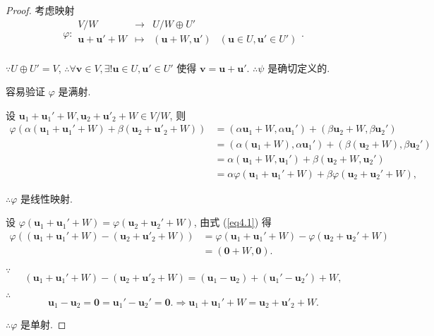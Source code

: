 \documentclass[color=black,device=normal,lang=cn,mode=geye]{elegantnote}
\begin{document}
\begin{proof}
    考虑映射
    \[\varphi:\begin{array}{rcll}
        V/W & \to & U/W\oplus U' \\
        \boldsymbol{u}+\boldsymbol{u}'+W & \mapsto & (\boldsymbol{u}+W,\boldsymbol{u}') & (\boldsymbol{u}\in U,\boldsymbol{u}'\in U') \\
    \end{array}.\]

    $\because U\oplus U'=V$, $\therefore\forall\boldsymbol{v}\in V,\exists!\boldsymbol{u}\in U,\boldsymbol{u}'\in U'$ 使得 $\boldsymbol{v}=\boldsymbol{u}+\boldsymbol{u}'$. $\therefore\psi$ 是确切定义的.

    容易验证 $\varphi$ 是满射.

    设 $\boldsymbol{u}_1+\boldsymbol{u}_1'+W,\boldsymbol{u}_2+\boldsymbol{u}'_2+W\in V/W$, 则
    \begin{equation}\label{eq4.1}
        \begin{aligned}
            \varphi(\alpha(\boldsymbol{u}_1+\boldsymbol{u}_1'+W)+\beta(\boldsymbol{u}_2+\boldsymbol{u}'_2+W)) & =(\alpha\boldsymbol{u}_1+W,\alpha\boldsymbol{u}_1')+(\beta\boldsymbol{u}_2+W,\beta\boldsymbol{u}_2') \\
            & =(\alpha(\boldsymbol{u}_1+W),\alpha\boldsymbol{u}_1')+(\beta(\boldsymbol{u}_2+W),\beta\boldsymbol{u}_2') \\
            & =\alpha(\boldsymbol{u}_1+W,\boldsymbol{u}_1')+\beta(\boldsymbol{u}_2+W,\boldsymbol{u}_2') \\
            & =\alpha\varphi(\boldsymbol{u}_1+\boldsymbol{u}_1'+W)+\beta\varphi(\boldsymbol{u}_2+\boldsymbol{u}_2'+W),
        \end{aligned}
    \end{equation}
    
    $\therefore\varphi$ 是线性映射.

    设 $\varphi(\boldsymbol{u}_1+\boldsymbol{u}_1'+W)=\varphi(\boldsymbol{u}_2+\boldsymbol{u}_2'+W)$, 由式 (\ref{eq4.1}) 得
    \begin{align*}
        \varphi((\boldsymbol{u}_1+\boldsymbol{u}_1'+W)-(\boldsymbol{u}_2+\boldsymbol{u}'_2+W)) & =\varphi(\boldsymbol{u}_1+\boldsymbol{u}_1'+W)-\varphi(\boldsymbol{u}_2+\boldsymbol{u}_2'+W) \\
        & =(\boldsymbol{0}+W,\boldsymbol{0}).
    \end{align*}

    $\because$
    \[(\boldsymbol{u}_1+\boldsymbol{u}_1'+W)-(\boldsymbol{u}_2+\boldsymbol{u}'_2+W)=(\boldsymbol{u}_1-\boldsymbol{u}_2)+(\boldsymbol{u}_1'-\boldsymbol{u}_2')+W,\]

    $\therefore$
    \[\boldsymbol{u}_1-\boldsymbol{u}_2=\boldsymbol{0}=\boldsymbol{u}_1'-\boldsymbol{u}_2'=\boldsymbol{0}.\Rightarrow\boldsymbol{u}_1+\boldsymbol{u}_1'+W=\boldsymbol{u}_2+\boldsymbol{u}'_2+W.\]

    $\therefore\varphi$ 是单射.
\end{proof}
\end{document}
